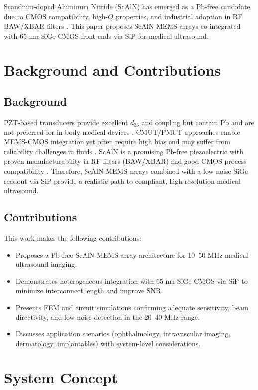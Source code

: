 \documentclass[conference]{IEEEtran}
\begin{document}
Scandium-doped Aluminum Nitride (ScAlN) has emerged as a Pb-free candidate due to CMOS compatibility, high-$Q$ properties, 
and industrial adoption in RF BAW/XBAR filters \cite{akrout2018scaln}. 
This paper proposes ScAlN MEMS arrays co-integrated with 65 nm SiGe CMOS front-ends via SiP for medical ultrasound.

\section{Background and Contributions}
\subsection{Background}
PZT-based transducers provide excellent $d_{33}$ and coupling but contain Pb and are not preferred for in-body medical devices \cite{akata2009pzt}. 
CMUT/PMUT approaches enable MEMS-CMOS integration yet often require high bias and may suffer from reliability challenges in fluids \cite{khuri2009cmut}. 
ScAlN is a promising Pb-free piezoelectric with proven manufacturability in RF filters (BAW/XBAR) and good CMOS process compatibility \cite{akrout2018scaln}. 
Therefore, ScAlN MEMS arrays combined with a low-noise SiGe readout via SiP provide a realistic path to compliant, high-resolution medical ultrasound.

\subsection{Contributions}
This work makes the following contributions:
\begin{itemize}
  \item Proposes a Pb-free ScAlN MEMS array architecture for 10--50 MHz medical ultrasound imaging.
  \item Demonstrates heterogeneous integration with 65 nm SiGe CMOS via SiP to minimize interconnect length and improve SNR.
  \item Presents FEM and circuit simulations confirming adequate sensitivity, beam directivity, and low-noise detection in the 20--40 MHz range.
  \item Discusses application scenarios (ophthalmology, intravascular imaging, dermatology, implantables) with system-level considerations.
\end{itemize}

\section{System Concept}
\end{document}
